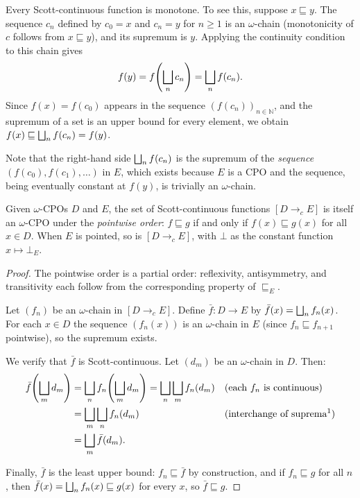 Every Scott-continuous function is monotone. To see this, suppose
$x \sqsubseteq y$. The sequence $c_n$ defined by $c_0 = x$ and $c_n = y$
for $n \geq 1$ is an $\omega$-chain (monotonicity of $c$ follows from
$x \sqsubseteq y$), and its supremum is $y$. Applying the continuity
condition to this chain gives
\[
  f(y) = f\!\left(\bigsqcup_n c_n\right) = \bigsqcup_n f(c_n).
\]
Since $f(x) = f(c_0)$ appears in the sequence $(f(c_n))_{n \in \mathbb{N}}$, and the supremum
of a set is an upper bound for every element, we obtain
$f(x) \sqsubseteq \bigsqcup_n f(c_n) = f(y)$.

Note that the right-hand side $\bigsqcup_n f(c_n)$ is the supremum of the
\emph{sequence} $(f(c_0), f(c_1), \ldots)$ in $E$, which exists because
$E$ is a CPO and the sequence, being eventually constant at $f(y)$, is
trivially an $\omega$-chain.

\begin{proposition}
\label{prop:function-space}
Given $\omega$-CPOs $D$ and $E$, the set of Scott-continuous functions
$[D \to_{c} E]$ is itself an $\omega$-CPO under the \emph{pointwise order}:
$f \sqsubseteq g$ if and only if $f(x) \sqsubseteq g(x)$ for all
$x \in D$. When $E$ is pointed, so is $[D \to_{c} E]$, with $\bot$ as the
constant function $x \mapsto \bot_E$.
\end{proposition}

\begin{proof}
The pointwise order is a partial order: reflexivity, antisymmetry, and
transitivity each follow from the corresponding property of
$\sqsubseteq_E$.

Let $(f_n)$ be an $\omega$-chain in $[D \to_{c} E]$. Define
$\bar{f} : D \to E$ by $\bar{f}(x) = \bigsqcup_n f_n(x)$. For each
$x \in D$ the sequence $(f_n(x))$ is an $\omega$-chain in $E$ (since
$f_n \sqsubseteq f_{n+1}$ pointwise), so the supremum exists.

We verify that $\bar{f}$ is Scott-continuous. Let $(d_m)$ be an
$\omega$-chain in $D$. Then:
\begin{align*}
  \bar{f}\!\left(\lub_m d_m\right)
    &= \lub_n f_n\!\left(\lub_m d_m\right)
     = \lub_n \lub_m f_n(d_m)
       && \text{(each $f_n$ is continuous)} \\
    &= \lub_m \lub_n f_n(d_m)
       && \text{(interchange of suprema\footnotemark)} \\
    &= \lub_m \bar{f}(d_m).
\end{align*}

Finally, $\bar{f}$ is the least upper bound: $f_n \sqsubseteq \bar{f}$
by construction, and if $f_n \sqsubseteq g$ for all $n$, then
$\bar{f}(x) = \bigsqcup_n f_n(x) \sqsubseteq g(x)$ for every $x$,
so $\bar{f} \sqsubseteq g$.
\end{proof}

